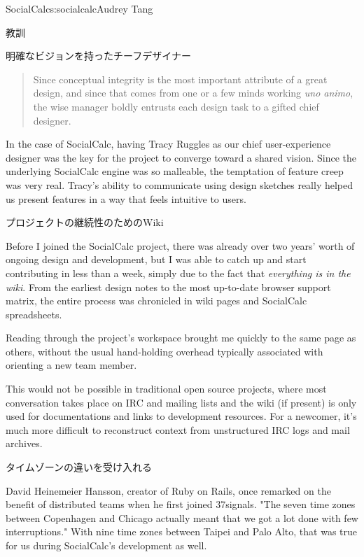 \begin{aosachapter}{SocialCalc}{s:socialcalc}{Audrey Tang}
\begin{aosasect1}{教訓}
\begin{aosasect2}{明確なビジョンを持ったチーフデザイナー}
\begin{quotation}

  \noindent
  Since conceptual integrity is the most important attribute of a
  great design, and since that comes from one or a few minds working
  \emph{uno animo}, the wise manager boldly entrusts each design task to a
  gifted chief designer.

\end{quotation}

In the case of SocialCalc, having Tracy Ruggles as our chief
user-experience designer was the key for the project to converge
toward a shared vision.  Since the underlying SocialCalc engine was
so malleable, the temptation of feature creep was very real. Tracy's
ability to communicate using design sketches really helped us
present features in a way that feels intuitive to users.

\end{aosasect2}

\begin{aosasect2}{プロジェクトの継続性のためのWiki}

Before I joined the SocialCalc project, there was already over two
years' worth of ongoing design and development, but I was able to
catch up and start contributing in less than a week, simply due to
the fact that \emph{everything is in the wiki}. From the earliest
design notes to the most up-to-date browser support matrix, the
entire process was chronicled in wiki pages and SocialCalc
spreadsheets.

Reading through the project's workspace brought me quickly to the same
page as others, without the usual hand-holding overhead
typically associated with orienting a new team member.

This would not be possible in traditional open source projects, where
most conversation takes place on IRC and mailing lists and the wiki
(if present) is only used for documentations and links to development
resources.  For a newcomer, it's much more difficult to reconstruct
context from unstructured IRC logs and mail archives.

\end{aosasect2}

\begin{aosasect2}{タイムゾーンの違いを受け入れる}

David Heinemeier Hansson, creator of Ruby on Rails, once remarked on
the benefit of distributed teams when he first joined 37signals. "The
seven time zones between Copenhagen and Chicago actually meant that
we got a lot done with few interruptions." With nine time zones
between Taipei and Palo Alto, that was true for us during
SocialCalc's development as well.


\end{aosasect2}
\end{aosasect1}
\end{aosachapter}
